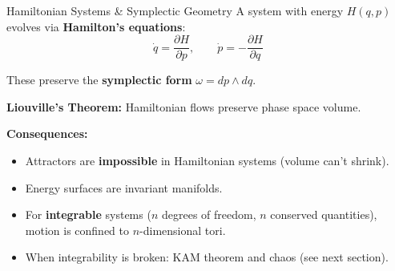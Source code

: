 \begin{frame}{Hamiltonian Systems \& Symplectic Geometry}
A system with energy $H(q,p)$ evolves via \textbf{Hamilton's equations}:
\[
\dot{q} = \frac{\partial H}{\partial p}, \qquad \dot{p} = -\frac{\partial H}{\partial q}
\]

These preserve the \textbf{symplectic form} $\omega = dp \wedge dq$.

\vspace{0.3cm}
\textbf{Liouville's Theorem:} Hamiltonian flows preserve phase space volume.

\vspace{0.2cm}
\textbf{Consequences:}
\begin{itemize}
    \item Attractors are \textbf{impossible} in Hamiltonian systems (volume can't shrink).
    \item Energy surfaces are invariant manifolds.
    \item For \textbf{integrable} systems ($n$ degrees of freedom, $n$ conserved quantities), motion is confined to $n$-dimensional tori.
    \item When integrability is broken: KAM theorem and chaos (see next section).
\end{itemize}
\end{frame}
